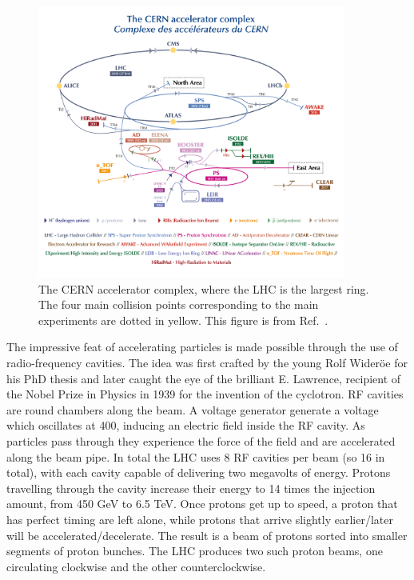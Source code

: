 \begin{figure}
  \includegraphics[width=0.9\textwidth]{Figures/LHC/CernAcceleratorComplex.png}
  \caption[The \CERN accelerator complex]%
  {The CERN accelerator complex, where the LHC is the largest ring. The four main collision points corresponding to the main experiments are dotted in yellow. This figure is from Ref.~\cite{Mobs:2684277}.}
  \label{fig:CERNComplex}
\end{figure}

The impressive feat of accelerating particles is made possible through the use of radio-frequency cavities. The idea was first crafted by the young Rolf Wideröe \cite{vretenar2012radio} for his PhD thesis and later caught the eye of the brilliant E. Lawrence, recipient of the Nobel Prize in Physics in 1939 for the invention of the cyclotron. RF cavities are round chambers along the beam. A voltage generator generate a voltage which oscillates at \unit{400}{\mega\hertz}, inducing an electric field inside the RF cavity. As particles pass through they experience the force of the field and are accelerated along the beam pipe. In total the LHC uses 8 RF cavities per beam (so 16 in total), with each cavity capable of delivering two megavolts of energy. Protons travelling through the cavity increase their energy to 14 times the injection amount, from 450 GeV to 6.5 TeV. Once protons get up to speed, a proton that has perfect timing are left alone, while protons that arrive slightly earlier/later will be accelerated/decelerate. The result is a beam of protons sorted into smaller segments of proton bunches. The LHC produces two such proton beams, one circulating clockwise and the other counterclockwise. 

